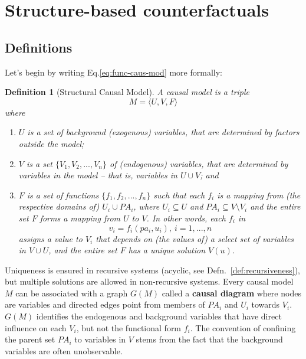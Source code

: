 \documentclass[11pt]{article}
\numberwithin{equation}{section}
\newtheorem{defn}{Definition}[section]
\begin{document}
\section{Structure-based counterfactuals}
\subsection{Definitions}
Let's begin by writing Eq.\eqref{eq:func-caus-mod} more formally:

\begin{defn}[Structural Causal Model] \label{defn:struct-causal-model}
A causal model is a triple
\begin{equation}
M = \langle U, V, F \rangle \nonumber
\end{equation}
where
\begin{enumerate}[noitemsep]
\item $U$ is a set of background (exogenous) variables, that are determined by factors outside the model;
\item $V$ is a set $\{V_1, V_2,..., V_n \}$ of (endogenous) variables, that are determined by variables in the model -- that is, variables in $U \cup V$; and
\item $F$ is a set of functions $\{f_1, f_2,...,f_n \}$ such that each $f_i$ is a mapping from (the respective domains of) $U_i \cup PA_i$, where $U_i \subseteq U$ and $PA_i \subseteq V \setminus V_i$ and the entire set $F$ forms a mapping from $U$ to $V$. In other words, each $f_i$ in
\begin{equation}
v_i = f_i(pa_i, u_i), \ i=1,...,n \label{eq:structural-equations}
\end{equation}
assigns a value to $V_i$ that depends on (the values of) a select set of variables in $V \cup U$, and the entire set $F$ has a unique solution $V(u)$.
\end{enumerate}
\end{defn}

Uniqueness is ensured in recursive systems (acyclic, see Defn.~\ref{def:recursiveness}), but multiple solutions are allowed in non-recursive systems. Every causal model $M$ can be associated with a graph $G(M)$ called a \textbf{causal diagram} where nodes are variables and directed edges point from members of $PA_i$ and $U_i$ towards $V_i$. $G(M)$ identifies the endogenous and background variables that have direct influence on each $V_i$, but not the functional form $f_i$. The convention of confining the parent set $PA_i$ to variables in $V$ stems from the fact that the background variables are often unobservable.
\end{document}
